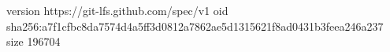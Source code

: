 version https://git-lfs.github.com/spec/v1
oid sha256:a7f1cfbc8da7574d4a5ff3d0812a7862ae5d1315621f8ad0431b3feea246a237
size 196704
